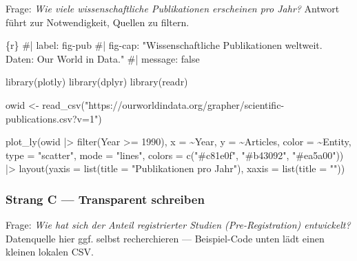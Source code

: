 \documentclass[
  ngerman,
  a4paper,
  DIV=11]{scrreprt}
\newenvironment{Shaded}{\begin{snugshade}}{\end{snugshade}}
\newcommand{\AttributeTok}[1]{\textcolor[rgb]{0.40,0.45,0.13}{#1}}
\newcommand{\CommentTok}[1]{\textcolor[rgb]{0.37,0.37,0.37}{#1}}
\newcommand{\DecValTok}[1]{\textcolor[rgb]{0.68,0.00,0.00}{#1}}
\newcommand{\FunctionTok}[1]{\textcolor[rgb]{0.28,0.35,0.67}{#1}}
\newcommand{\InformationTok}[1]{\textcolor[rgb]{0.37,0.37,0.37}{#1}}
\newcommand{\NormalTok}[1]{\textcolor[rgb]{0.00,0.23,0.31}{#1}}
\newcommand{\OtherTok}[1]{\textcolor[rgb]{0.00,0.23,0.31}{#1}}
\newcommand{\SpecialCharTok}[1]{\textcolor[rgb]{0.37,0.37,0.37}{#1}}
\newcommand{\StringTok}[1]{\textcolor[rgb]{0.13,0.47,0.30}{#1}}
\begin{document}
Frage: \emph{Wie viele wissenschaftliche Publikationen erscheinen pro
Jahr?} Antwort führt zur Notwendigkeit, Quellen zu filtern.

\begin{Shaded}
\begin{Highlighting}[]
\InformationTok{\textasciigrave{}\textasciigrave{}\textasciigrave{}\{r\}}
\CommentTok{\#| label: fig{-}pub}
\CommentTok{\#| fig{-}cap: "Wissenschaftliche Publikationen weltweit. Daten: Our World in Data."}
\CommentTok{\#| message: false}

\FunctionTok{library}\NormalTok{(plotly)}
\FunctionTok{library}\NormalTok{(dplyr)}
\FunctionTok{library}\NormalTok{(readr)}

\NormalTok{owid }\OtherTok{\textless{}{-}} \FunctionTok{read\_csv}\NormalTok{(}\StringTok{"https://ourworldindata.org/grapher/scientific{-}publications.csv?v=1"}\NormalTok{)}

\FunctionTok{plot\_ly}\NormalTok{(owid }\SpecialCharTok{|\textgreater{}} \FunctionTok{filter}\NormalTok{(Year }\SpecialCharTok{\textgreater{}=} \DecValTok{1990}\NormalTok{),}
        \AttributeTok{x =} \SpecialCharTok{\textasciitilde{}}\NormalTok{Year, }\AttributeTok{y =} \SpecialCharTok{\textasciitilde{}}\StringTok{\textasciigrave{}}\AttributeTok{Articles}\StringTok{\textasciigrave{}}\NormalTok{,}
        \AttributeTok{color =} \SpecialCharTok{\textasciitilde{}}\NormalTok{Entity, }\AttributeTok{type =} \StringTok{"scatter"}\NormalTok{, }\AttributeTok{mode =} \StringTok{"lines"}\NormalTok{,}
        \AttributeTok{colors =} \FunctionTok{c}\NormalTok{(}\StringTok{"\#c81e0f"}\NormalTok{, }\StringTok{"\#b43092"}\NormalTok{, }\StringTok{"\#ea5a00"}\NormalTok{)) }\SpecialCharTok{|\textgreater{}}
  \FunctionTok{layout}\NormalTok{(}\AttributeTok{yaxis =} \FunctionTok{list}\NormalTok{(}\AttributeTok{title =} \StringTok{"Publikationen pro Jahr"}\NormalTok{),}
         \AttributeTok{xaxis =} \FunctionTok{list}\NormalTok{(}\AttributeTok{title =} \StringTok{""}\NormalTok{))}
\InformationTok{\textasciigrave{}\textasciigrave{}\textasciigrave{}}
\end{Highlighting}
\end{Shaded}

\subsubsection{Strang C --- Transparent schreiben}

Frage: \emph{Wie hat sich der Anteil registrierter Studien
(Pre-Registration) entwickelt?} Datenquelle hier ggf. selbst
recherchieren --- Beispiel-Code unten lädt einen kleinen lokalen CSV.
\end{document}
